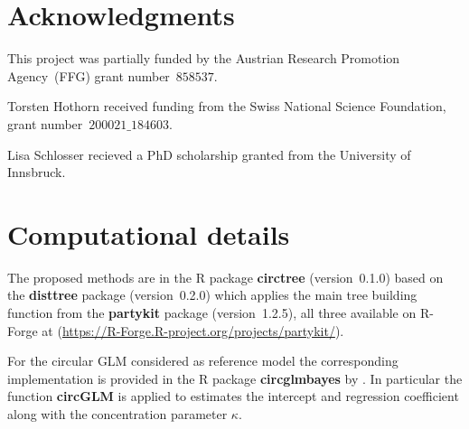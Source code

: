 \documentclass[nojss]{jss}
\numberwithin{equation}{section}
\begin{document}


\section*{Acknowledgments}
This project was partially funded by the Austrian Research Promotion 
Agency~(FFG) grant number~$858537$.

Torsten Hothorn received funding from the Swiss National Science
Foundation, grant number~$200021\_184603$.

Lisa Schlosser recieved a PhD scholarship granted from the University of Innsbruck.


\section*{Computational details}

The proposed methods are in the \textsf{R} package \textbf{circtree}
(version~0.1.0) based on the \textbf{disttree}
package (version~0.2.0) which applies the main
tree building function from the  \textbf{partykit} package 
(version~1.2.5), all three available 
on \textsf{R}-Forge at
(\url{https://R-Forge.R-project.org/projects/partykit/}). 


For the circular GLM considered as reference model the corresponding implementation is provided 
in the \textsf{R} package \textbf{circglmbayes} by \cite{Mulder+Klugkist:2017}. In particular the 
function \textbf{circGLM} is applied to estimates the intercept and regression coefficient along with 
the concentration parameter $\kappa$.



\end{document}
